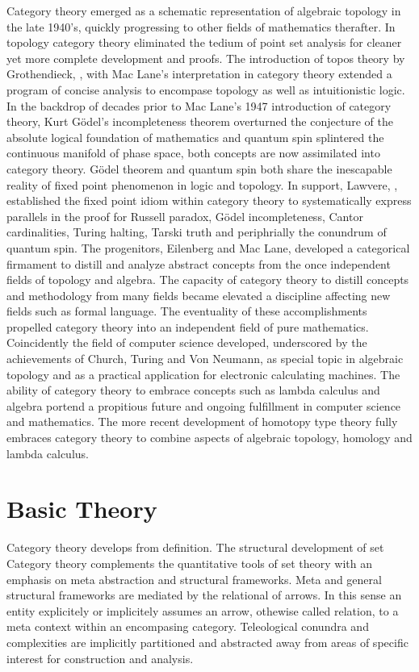 \documentclass[aps,twocolumn,secnumarabic,nobalancelastpage,amsmath,amssymb,
amsthm,nofootinbib,parskip=full]{revtex4}
\numberwithin{equation}{section}
\begin{document}
Category theory emerged as a schematic representation of
algebraic topology in the late 1940's, quickly progressing
to other fields of mathematics therafter.
In topology category theory eliminated the tedium of point set
analysis for cleaner yet more complete development and proofs.
The introduction of topos theory by Grothendieck,
\cite{grothendieck1957}, with Mac Lane's interpretation in
category theory extended a program of concise analysis to
encompase topology as well as intuitionistic logic.
In the backdrop of decades prior to Mac Lane's 1947 introduction
of category theory, Kurt G\"{o}del's incompleteness theorem overturned the
conjecture of the absolute logical foundation of mathematics and quantum
spin splintered the continuous manifold of phase space,
both concepts are now assimilated into category theory.
G\"{o}del theorem and quantum spin both share the inescapable
reality of fixed point phenomenon in logic and topology.
In support, Lawvere, \cite{lawvere1997}, established the fixed point idiom
within category theory to systematically express parallels in the proof for
Russell paradox, G\"{o}del incompleteness, Cantor cardinalities,
Turing halting, Tarski truth and periphrially the conundrum of quantum spin.
The progenitors, Eilenberg and Mac Lane, developed a categorical firmament to
distill and analyze abstract concepts from the once independent fields
of topology and algebra. The capacity of category theory
to distill concepts and methodology from many fields became
elevated a discipline affecting new fields such as formal language.
The eventuality of these accomplishments propelled
category theory into an independent field of pure mathematics.
Coincidently the field of computer science developed,
underscored by the achievements of Church, Turing and Von Neumann,
as special topic in algebraic topology and as a practical
application for electronic calculating machines.
The ability of category theory to embrace concepts
such as lambda calculus and algebra portend a propitious
future and ongoing fulfillment in computer science and mathematics.
The more recent development of homotopy type theory fully embraces
category theory to combine aspects of algebraic topology, homology and
lambda calculus.

\section{Basic Theory}\label{sec:basictheory}

Category theory develops from definition.
The structural development of set 
Category theory complements the quantitative 
tools of set theory with an emphasis on meta abstraction and
structural frameworks. Meta and general structural frameworks
are mediated by the relational of arrows. In this sense
an entity explicitely or implicitely assumes an arrow, othewise
called relation, to a meta context within an encompasing category.
Teleological conundra and complexities are implicitly partitioned and
abstracted away from areas of specific interest for construction and analysis.
\end{document}
